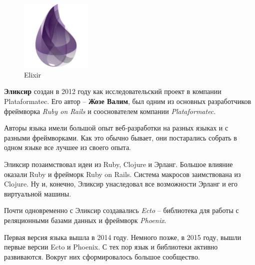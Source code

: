 \begin{figure}[h]
  \centering
  \includegraphics[width=0.3\textwidth]{../lesson_02/img/elixir_logo.png}
  \caption{Elixir}
\end{figure}

\textbf{Эликсир} создан в 2012 году как исследовательский проект в компании Plataformatec. Его автор -- \textbf{Жозе Валим}, был одним из основных разработчиков фреймворка \textit{Ruby on Rails} и сооснователем компании \textit{Plataformatec}.

Авторы языка имели большой опыт веб-разработки на разных языках и с разными фреймворками. Как это обычно бывает, они постарались собрать в одном языке все лучшее из своего опыта.

Эликсир позаимствовал идеи из Ruby, Clojure и Эрланг. Большое влияние оказали Ruby и фрейморк Ruby on Rails. Система макросов заимствована из Clojure. Ну и, конечно, Эликсир унаследовал все возможности Эрланг и его виртуальной машины.

Почти одновременно с Эликсир создавались \textit{Ecto} -- библиотека для работы с реляционными базами данных и фреймворк \textit{Phoenix}.

Первая версия языка вышла в 2014 году. Немного позже, в 2015 году, вышли первые версии Ecto и Phoenix. С тех пор язык и библиотеки активно развиваются. Вокруг них сформировалось большое сообщество.
